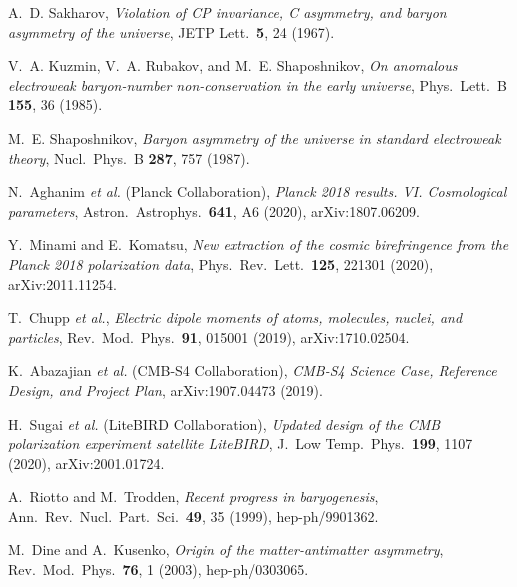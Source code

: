 \documentclass[11pt]{article}
\begin{document}
\begin{thebibliography}{99}

A.~D. Sakharov,
\textit{Violation of CP invariance, C asymmetry, and baryon asymmetry of the universe},
JETP Lett.\ \textbf{5}, 24 (1967).

V.~A. Kuzmin, V.~A. Rubakov, and M.~E. Shaposhnikov,
\textit{On anomalous electroweak baryon-number non-conservation in the early universe},
Phys.\ Lett.\ B \textbf{155}, 36 (1985).

M.~E. Shaposhnikov,
\textit{Baryon asymmetry of the universe in standard electroweak theory},
Nucl.\ Phys.\ B \textbf{287}, 757 (1987).

N.~Aghanim \textit{et al.} (Planck Collaboration),
\textit{Planck 2018 results. VI. Cosmological parameters},
Astron.\ Astrophys.\ \textbf{641}, A6 (2020), arXiv:1807.06209.

Y.~Minami and E.~Komatsu,
\textit{New extraction of the cosmic birefringence from the Planck 2018 polarization data},
Phys.\ Rev.\ Lett.\ \textbf{125}, 221301 (2020), arXiv:2011.11254.

T.~Chupp \textit{et al.},
\textit{Electric dipole moments of atoms, molecules, nuclei, and particles},
Rev.\ Mod.\ Phys.\ \textbf{91}, 015001 (2019), arXiv:1710.02504.

K.~Abazajian \textit{et al.} (CMB-S4 Collaboration),
\textit{CMB-S4 Science Case, Reference Design, and Project Plan},
arXiv:1907.04473 (2019).

H.~Sugai \textit{et al.} (LiteBIRD Collaboration),
\textit{Updated design of the CMB polarization experiment satellite LiteBIRD},
J.\ Low Temp.\ Phys.\ \textbf{199}, 1107 (2020), arXiv:2001.01724.

A.~Riotto and M.~Trodden,
\textit{Recent progress in baryogenesis},
Ann.\ Rev.\ Nucl.\ Part.\ Sci.\ \textbf{49}, 35 (1999), hep-ph/9901362.

M.~Dine and A.~Kusenko,
\textit{Origin of the matter-antimatter asymmetry},
Rev.\ Mod.\ Phys.\ \textbf{76}, 1 (2003), hep-ph/0303065.

\end{thebibliography}
\end{document}
